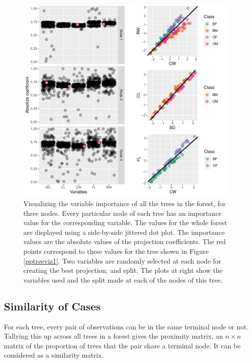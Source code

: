 \documentclass[smallextended,natbib]{svjour3}\usepackage[]{graphicx}\usepackage[]{xcolor}
\makeatletter
\def\maxwidth{ %
  \ifdim\Gin@nat@width>\linewidth
    \linewidth
  \else
    \Gin@nat@width
  \fi
}
\newenvironment{knitrout}{}{} %
\makeatother
\begin{document}
\begin{figure}[hbpt]
\centering
\begin{knitrout}
\color{fgcolor}
\includegraphics[width=\maxwidth]{treenode-1} 
\end{knitrout}
\caption{Visualizing the variable importance of all the trees in the forest, for three nodes. Every particular node of each tree has an importance value for the corresponding variable. The values for the whole forest are displayed using a side-by-side jittered dot plot. The importance values are the absolute values of the projection coefficients. The red points correspond to these values for the tree shown in Figure \ref{pptreeviz1}. Two variables are randomly selected at each node for creating the best projection, and split. The plots at right show the variables used and the split made at each of the nodes of this tree.  \label{impotree}}
\end{figure}

\newpage

\subsection{Similarity of Cases}

For each tree, every pair of observations can be in the same terminal node or not. Tallying this up across all trees in a forest gives the proximity matrix, an $n\times n$ matrix of the proportion of trees that the pair share a terminal node. It can be considered as a similarity matrix.
\end{document}
